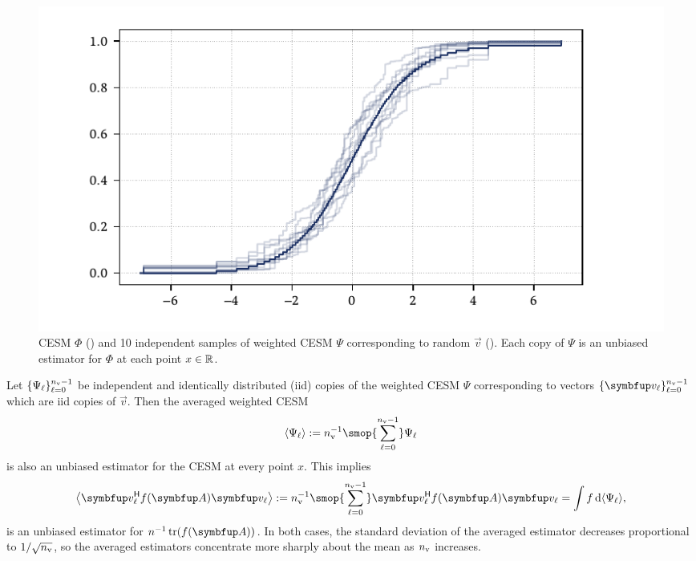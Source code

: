 \begin{figure}[htb]
    \includegraphics[width=\textwidth]{imgs/ch4_CESMwCESM.pdf}
    \caption[{CESM \( \Phi \) and independent 10 samples of weighted CESM \( \Psi \)}]{
        CESM \( \Phi \) 
        ({\protect{}})
        and 10 independent samples of weighted CESM \( \Psi \) corresponding to random \( \vec{v} \) 
        ({\protect{}}).
        Each copy of \( \Psi \) is an unbiased estimator for \( \Phi \) at each point \( x\in\mathbb{R} \).
    }
    \label{fig:ch4_CESMwCESM}
\end{figure}

Let \( \{ \Psi_\ell \}_{\ell=0}^{n_{\textup{v}}-1} \) be independent and identically distributed (iid) copies of the weighted CESM \( \Psi \) corresponding to vectors \( \{ \vec{v}_\ell \}_{\ell=0}^{\nv-1} \) which are iid copies of \( \vec{v} \).
Then the averaged weighted CESM 
\label{eqn:ave_notation}
\begin{equation*}
    \samp{ \Psi_\ell } := \nv^{-1} \smop{\sum_{\ell=0}^{\nv-1}} \Psi_\ell 
\end{equation*}
is also an unbiased estimator for the CESM at every point \( x \).
This implies 
\begin{equation*}
    \samp[\big]{ \vec{v}_{\ell}^\cT \fA \vec{v}_\ell }
    := \nv^{-1} \smop{\sum_{\ell=0}^{\nv-1}} \vec{v}_\ell^\cT \fA \vec{v}_\ell
    = \int f \,\d \samp{\Psi_\ell},
\end{equation*}
is an unbiased estimator for \( n^{-1} \tr(\fA) \).
In both cases, the standard deviation of the averaged estimator decreases proportional to \( 1/\sqrt{n_{\textup{v}}} \), so the averaged estimators concentrate more sharply about the mean as \( n_{\textup{v}} \) increases.


